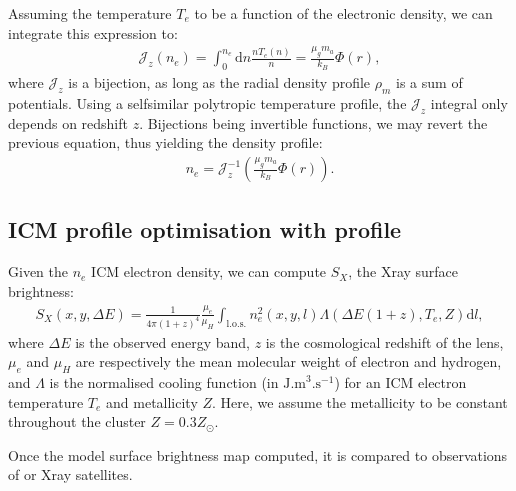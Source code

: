 \documentclass[letterpaper,10pt,english]{sphinxmanual}
\begin{document}
\sphinxAtStartPar
Assuming the temperature
\(T_e\) to be a function of the electronic density, we can integrate this expression to:
\begin{equation*}
\begin{split}\mathcal{J}_z (n_e) = \int_0^{n_e} \mathrm{d} n \frac{n T_e (n)}{n} = \frac{\mu_g m_a}{k_B} \Phi (r),\end{split}
\end{equation*}
\sphinxAtStartPar
where
\(\mathcal{J}_z\) is a bijection, as long as the radial density profile
\(\rho_m\) is a sum of  potentials.
Using a self\sphinxhyphen{}similar polytropic temperature profile, the
\(\mathcal{J}_z\) integral only depends on redshift
\(z\).
Bijections being invertible functions, we may revert the previous equation, thus yielding the  density profile:
\begin{equation*}
\begin{split}n_e = \mathcal{J}^{-1}_z  \left( \frac{\mu_g m_a}{k_B} \Phi (r) \right).\end{split}
\end{equation*}

\subsection{ICM profile optimisation with  profile}
\label{\detokenize{usage:icm-profile-optimisation-with-idpie-profile}}
\sphinxAtStartPar
Given the
\(n_e\) ICM electron density, we can compute
\(S_X\), the X\sphinxhyphen{}ray surface brightness:
\begin{equation*}
\begin{split}S_X (x, y, \Delta E) = \frac{1}{4 \pi (1 + z)^4} \frac{\mu_e}{\mu_H} \int_{\mathrm{l.o.s.}} n_e^2 (x, y, l) \Lambda (\Delta E (1 + z), T_e, Z) \mathrm{d}l,\end{split}
\end{equation*}
\sphinxAtStartPar
where
\(\Delta E\) is the observed energy band,
\(z\) is the cosmological redshift of the lens,
\(\mu_e\) and
\(\mu_H\) are respectively the mean molecular weight of electron and hydrogen, and
\(\Lambda\) is the normalised cooling function (in
\(\mathrm{J.m}^3.\mathrm{s}^{-1}\)) for an ICM electron temperature
\(T_e\) and metallicity
\(Z\).
Here, we assume the metallicity to be constant throughout the cluster
\(Z = 0.3 Z_{\odot}\).

\sphinxAtStartPar
Once the model surface brightness map computed, it is compared to observations of  or  X\sphinxhyphen{}ray satellites.
\end{document}
